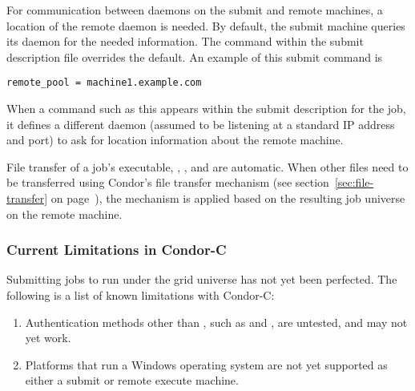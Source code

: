 For communication between  daemons on the submit
and remote machines,
a location of the remote  daemon is needed.
By default, the submit machine queries its 
daemon for the needed information.
The 
command within the submit
description file overrides the default.
An example of this submit command is
\footnotesize
\begin{verbatim}
remote_pool = machine1.example.com
\end{verbatim}
\normalsize
When a command such as this appears within the submit description
for the job,
it defines a different  daemon 
(assumed to be listening at a standard IP address and port)
to ask for location information about the remote machine.

File transfer of a job's executable, , , and
 are automatic.
When other files need to be transferred using Condor's file transfer
mechanism
(see section~\ref{sec:file-transfer} on page~\pageref{sec:file-transfer}),
the mechanism is applied based on the resulting job universe on the
remote machine.


%

\subsubsection{\label{sec:Condor-C-Limits}Current Limitations in Condor-C}
Submitting jobs to run under the grid universe has not yet
been perfected.
The following is a list of known limitations with Condor-C:

\begin{enumerate}
  \item{Authentication methods other than
  , such as  and , are 
  untested, and may not yet work.}

  \item{Platforms that run a Windows operating system
are not yet supported as either a submit or remote execute
machine.}
\end{enumerate}



